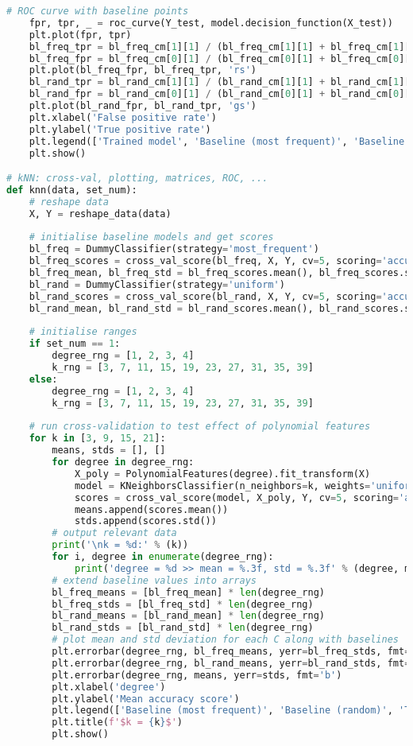 \documentclass[12pt]{article}
\begin{document}
\begin{lstlisting}[language=Python]
    # ROC curve with baseline points
    fpr, tpr, _ = roc_curve(Y_test, model.decision_function(X_test))
    plt.plot(fpr, tpr)
    bl_freq_tpr = bl_freq_cm[1][1] / (bl_freq_cm[1][1] + bl_freq_cm[1][0])
    bl_freq_fpr = bl_freq_cm[0][1] / (bl_freq_cm[0][1] + bl_freq_cm[0][0])
    plt.plot(bl_freq_fpr, bl_freq_tpr, 'rs')
    bl_rand_tpr = bl_rand_cm[1][1] / (bl_rand_cm[1][1] + bl_rand_cm[1][0])
    bl_rand_fpr = bl_rand_cm[0][1] / (bl_rand_cm[0][1] + bl_rand_cm[0][0])
    plt.plot(bl_rand_fpr, bl_rand_tpr, 'gs')
    plt.xlabel('False positive rate')
    plt.ylabel('True positive rate')
    plt.legend(['Trained model', 'Baseline (most frequent)', 'Baseline (random)'])
    plt.show()

# kNN: cross-val, plotting, matrices, ROC, ...
def knn(data, set_num):
    # reshape data
    X, Y = reshape_data(data)
    
    # initialise baseline models and get scores
    bl_freq = DummyClassifier(strategy='most_frequent')
    bl_freq_scores = cross_val_score(bl_freq, X, Y, cv=5, scoring='accuracy')
    bl_freq_mean, bl_freq_std = bl_freq_scores.mean(), bl_freq_scores.std()
    bl_rand = DummyClassifier(strategy='uniform')
    bl_rand_scores = cross_val_score(bl_rand, X, Y, cv=5, scoring='accuracy')
    bl_rand_mean, bl_rand_std = bl_rand_scores.mean(), bl_rand_scores.std()
    
    # initialise ranges
    if set_num == 1:
        degree_rng = [1, 2, 3, 4]
        k_rng = [3, 7, 11, 15, 19, 23, 27, 31, 35, 39]
    else:
        degree_rng = [1, 2, 3, 4]
        k_rng = [3, 7, 11, 15, 19, 23, 27, 31, 35, 39]
    
    # run cross-validation to test effect of polynomial features
    for k in [3, 9, 15, 21]:
        means, stds = [], []
        for degree in degree_rng:
            X_poly = PolynomialFeatures(degree).fit_transform(X)
            model = KNeighborsClassifier(n_neighbors=k, weights='uniform').fit(X_poly, Y)
            scores = cross_val_score(model, X_poly, Y, cv=5, scoring='accuracy')
            means.append(scores.mean())
            stds.append(scores.std())
        # output relevant data
        print('\nk = %d:' % (k))
        for i, degree in enumerate(degree_rng):
            print('degree = %d >> mean = %.3f, std = %.3f' % (degree, means[i], stds[i]))
        # extend baseline values into arrays
        bl_freq_means = [bl_freq_mean] * len(degree_rng)
        bl_freq_stds = [bl_freq_std] * len(degree_rng)
        bl_rand_means = [bl_rand_mean] * len(degree_rng)
        bl_rand_stds = [bl_rand_std] * len(degree_rng)
        # plot mean and std deviation for each C along with baselines
        plt.errorbar(degree_rng, bl_freq_means, yerr=bl_freq_stds, fmt='y')
        plt.errorbar(degree_rng, bl_rand_means, yerr=bl_rand_stds, fmt='g')
        plt.errorbar(degree_rng, means, yerr=stds, fmt='b')
        plt.xlabel('degree')
        plt.ylabel('Mean accuracy score')
        plt.legend(['Baseline (most frequent)', 'Baseline (random)', 'Trained model'])
        plt.title(f'$k = {k}$')
        plt.show()
    

\end{lstlisting}
\end{document}
